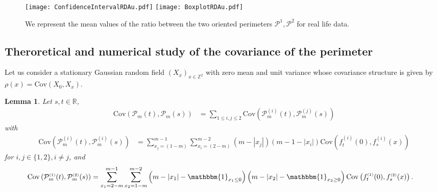\documentclass[12pt]{article}
\theoremstyle{Theorem}
\newtheorem{Lemma}[Theorem]{Lemma}
\begin{document}
\begin{figure}[H]
  \centering
    {\texttt{[image: ConfidenceIntervalRDAu.pdf]}}
    {\texttt{[image: BoxplotRDAu.pdf]}}
    \hspace{0.2cm}
 \caption{We represent the mean values of the ratio between the two oriented perimeters $\mathcal{P}^{1}, \mathcal{P}^{2}$ for real life data.}
\label{fig2}
\end{figure}
\subsection{Theroretical and numerical study of the covariance of the perimeter}
Let us consider a stationary Gaussian random field $\left(X_{\scriptscriptstyle x}\right)_{x \in \mathbb{Z}^{2}}$ with zero mean and unit variance whose covariance structure is given by $\rho(x) = \text{Cov}\left(X_{\scriptscriptstyle 0}, X_{\scriptscriptstyle x}\right)$.
\begin{Lemma} 
Let $s, t \in \mathbb{R}$, 
\label{CovLemma}
\begin{align*}
\text{Cov}(\mathcal{P}_{m}(t), \mathcal{P}_{m}(s))  & = \sum_{1\leq i,j\leq 2}\text{Cov}(\mathcal{P}_{m}^{\scriptscriptstyle (i)}(t), \mathcal{P}_{m}^{\scriptscriptstyle (j)}(s)) 
\end{align*} 
with 
\begin{align*}
\text{Cov}\left(\mathcal{P}_{m}^{\scriptscriptstyle (i)}(t),\mathcal{P}_{m}^{\scriptscriptstyle (i)}(s) \right) 
& = \sum_{x_{\scriptscriptstyle j}=\left(1-m\right)}^{m-1}\sum_{x_{\scriptscriptstyle i}=\left(2-m\right)}^{m-2}\left(m -|x_{j}|\right)\left(m - 1- |x_{i}|\right) \text{Cov}\left(f_{t}^{\scriptscriptstyle (i)}(0), f_{s}^{\scriptscriptstyle (i)}(x) \right) 
\end{align*} 
for $i,j \in\{1,2\}, i\neq j$, and 
\begin{align*}
\text{Cov}\left(\mathcal{P}_{m}^{\scriptscriptstyle (1)}(t),\mathcal{P}_{m}^{\scriptscriptstyle (2)}(s) \right) 
& = \sum_{x_1=2-m}^{m-1} \sum_{x_2 = 1-m}^{m-2} \left(m-|x_1| - \mathbbm{1}_{x_{1} \leq 0}\right)\left(m-|x_2|-\mathbbm{1}_{x_{2} \geq 0}\right)\text{Cov}\left(f_{t}^{\scriptscriptstyle (1)}(0), f_{s}^{ \scriptscriptstyle (2)}(x) \right).
\end{align*}
\end{Lemma}
\end{document}
